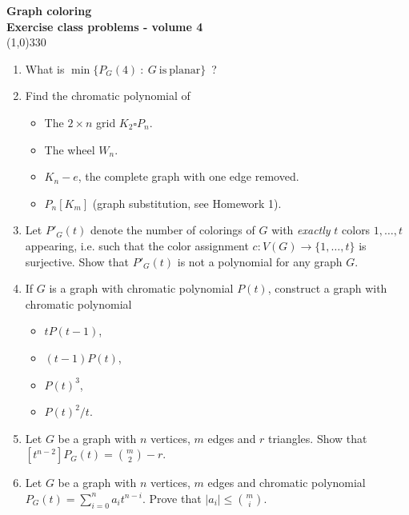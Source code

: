 \documentclass[a4paper]{article}
\begin{document}
\pagestyle{empty}
\begin{center}
	{\Large\bf Graph coloring}\\
	{\large\bf Exercise class problems - volume 4}\\
	\line(1,0){330}
\end{center}

\begin{enumerate}
\item What is $\min\{P_G(4)~:~G\ \mathrm{is\ planar}\}$\ ?
\item Find the chromatic polynomial of
\begin{itemize}
\item The $2\times n$ grid $K_2\square P_n$.
\item The wheel $W_n$.
\item $K_n-e$, the complete graph with one edge removed.
\item $P_n[K_m]$ (graph substitution, see Homework 1).
\end{itemize}
\item Let $P'_G(t)$ denote the number of colorings of $G$ with \emph{exactly} $t$ colors $1,\ldots,t$ appearing, i.e. such that the color assignment $c:V(G)\to\{1,\ldots,t\}$ is surjective. Show that $P'_G(t)$ is not a polynomial for any graph $G$.
\item If $G$ is a graph with chromatic polynomial $P(t)$, construct a graph with chromatic polynomial
\begin{itemize}
\item $tP(t-1)$,
\item $(t-1)P(t)$,
\item $P(t)^3$,
\item $P(t)^2/t$.
\end{itemize}
\item Let $G$ be a graph with $n$ vertices, $m$ edges and $r$ triangles. Show that $[t^{n-2}]P_G(t)={m\choose 2}-r$.
\item Let $G$ be a graph with $n$ vertices, $m$ edges and chromatic polynomial $P_G(t)=\sum_{i=0}^na_it^{n-i}$. Prove that $|a_i|\leq{m\choose i}$.
\end{enumerate}
\end{document}
